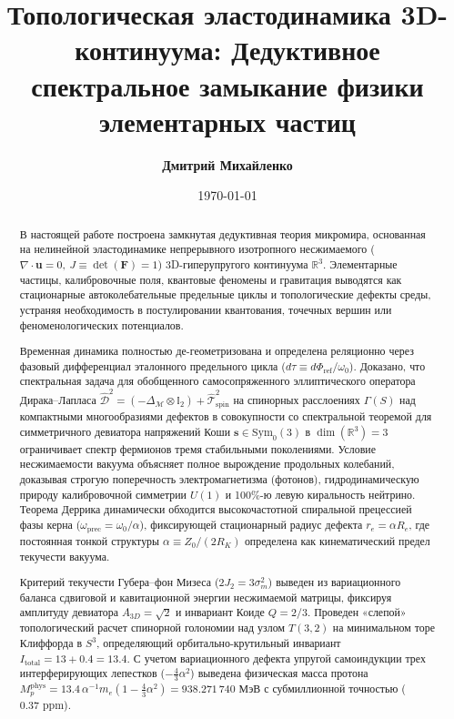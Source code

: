 \documentclass[12pt,a4paper]{article}
\title{\textbf{Топологическая эластодинамика 3D-континуума: Дедуктивное спектральное замыкание физики элементарных частиц}}
\author{\textbf{Дмитрий Михайленко}}
\date{\today}
\begin{document}
	
	\maketitle
	
	\begin{abstract}
		В настоящей работе построена замкнутая дедуктивная теория микромира, основанная на нелинейной эластодинамике непрерывного изотропного несжимаемого ($\nabla \cdot \mathbf{u} = 0, \ J \equiv \det(\mathbf{F}) = 1$) 3D-гиперупругого континуума $\mathbb{R}^3$. Элементарные частицы, калибровочные поля, квантовые феномены и гравитация выводятся как стационарные автоколебательные предельные циклы и топологические дефекты среды, устраняя необходимость в постулировании квантования, точечных вершин или феноменологических потенциалов.
		
		Временная динамика полностью де-геометризована и определена реляционно через фазовый дифференциал эталонного предельного цикла ($d\tau \equiv d\Phi_{\text{ref}}/\omega_0$). Доказано, что спектральная задача для обобщенного самосопряженного эллиптического оператора Дирака--Лапласа $\hat{\mathcal{D}}^2 = (-\Delta_{\mathcal{M}} \otimes \mathbb{I}_2) + \hat{\mathcal{T}}_{\text{spin}}^2$ на спинорных расслоениях $\Gamma(S)$ над компактными многообразиями дефектов в совокупности со спектральной теоремой для симметричного девиатора напряжений Коши $\mathbf{s} \in \mathrm{Sym}_0(3)$ в $\dim(\mathbb{R}^3) = 3$ ограничивает спектр фермионов тремя стабильными поколениями. Условие несжимаемости вакуума объясняет полное вырождение продольных колебаний, доказывая строгую поперечность электромагнетизма (фотонов), гидродинамическую природу калибровочной симметрии $U(1)$ и 100\%-ю левую киральность нейтрино. Теорема Деррика динамически обходится высокочастотной спиральной прецессией фазы керна ($\omega_{\text{prec}} = \omega_0 / \alpha$), фиксирующей стационарный радиус дефекта $r_e = \alpha R_e$, где постоянная тонкой структуры $\alpha \equiv Z_0 / (2R_K)$ определена как кинематический предел текучести вакуума.
		
		Критерий текучести Губера--фон Мизеса ($2J_2 = 3\sigma_m^2$) выведен из вариационного баланса сдвиговой и кавитационной энергии несжимаемой матрицы, фиксируя амплитуду девиатора $A_{3D} = \sqrt{2}$ и инвариант Коиде $Q = 2/3$. Проведен «слепой» топологический расчет спинорной голономии над узлом $T(3,2)$ на минимальном торе Клиффорда в $S^3$, определяющий орбитально-крутильный инвариант $I_{\text{total}} = 13 + 0.4 = 13.4$. С учетом вариационного дефекта упругой самоиндукции трех интерферирующих лепестков ($-\frac{4}{3}\alpha^2$) выведена физическая масса протона $M_p^{\text{phys}} = 13.4 \, \alpha^{-1} m_e (1 - \frac{4}{3}\alpha^2) = 938.271\,740$ МэВ с субмиллионной точностью ($0.37 \text{ ppm}$).
		

\end{abstract}
\end{document}
